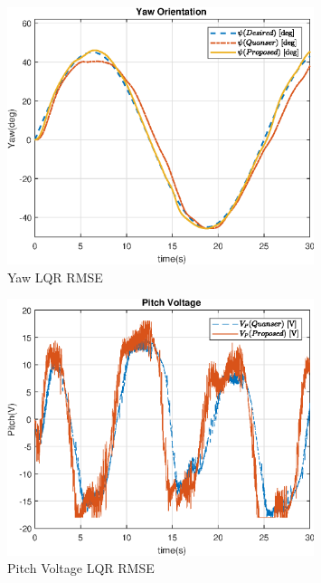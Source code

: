 \documentclass[fontsize=11pt, %
                             paper=letter, %
                             openany, %
                             captions=tableheading,
                             index=totoc,
                             hyperref]{labbook}
\begin{document}
\begin{addmargin}[0cm]{0cm}
\begin{figure}
  \centering
  \includegraphics[width=0.8\textwidth]{figs/img/02262019/Yaw_LQR_RMSE.eps}
  \caption{Yaw LQR RMSE}
  \label{fig:Yaw_LQR_RMSE}
\end{figure}

\begin{figure}
  \centering
  \includegraphics[width=0.8\textwidth]{figs/img/02262019/PitchVoltage_LQR_RMSE.eps}
  \caption{Pitch Voltage LQR RMSE}
  \label{fig:PitchVoltage_LQR_RMSE}
\end{figure}


\end{addmargin}
\end{document}
